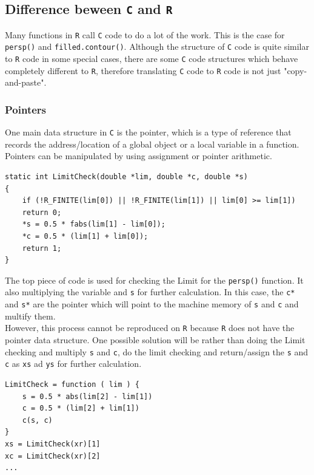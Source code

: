 \documentclass[paper=a4, fontsize=11pt]{report}
\begin{document}
\subsection{Difference beween \texttt{C} and \texttt{R}}
Many functions in \texttt{R} call \texttt{C} code to do a lot of the work.  This is the case for \texttt{persp()} and \texttt{filled.contour()}. Although the structure of \texttt{C} code is quite similar to \texttt{R} code in some special cases, there are some \texttt{C} code structures which behave completely different to \texttt{R}, therefore translating \texttt{C} code to \texttt{R} code is not just "copy-and-paste".\\

\subsubsection{Pointers}
One main data structure in \texttt{C} is the pointer, which is a type of reference that records the address/location of a global object or a local variable in a function. Pointers can be manipulated by using assignment or pointer arithmetic.
\begin{lstlisting}
static int LimitCheck(double *lim, double *c, double *s)
{
    if (!R_FINITE(lim[0]) || !R_FINITE(lim[1]) || lim[0] >= lim[1])
    return 0;
    *s = 0.5 * fabs(lim[1] - lim[0]);
    *c = 0.5 * (lim[1] + lim[0]);
    return 1;
}
\end{lstlisting}

The top piece of code is used for checking the Limit for the \texttt{persp()} function. It also multiplying the variable  and \texttt{s} for further calculation. In this case, the \texttt{c*} and \texttt{s*} are the pointer which will point to the machine memory of \texttt{s} and \texttt{c} and multify them.\\

However, this process cannot be reproduced on \texttt{R} because \texttt{R} does not have the pointer data structure. One possible solution will be rather than doing the Limit checking and multiply \texttt{s} and \texttt{c}, do the limit checking and return/assign the \texttt{s} and \texttt{c} as \texttt{xs} ad \texttt{ys} for further calculation.
\begin{lstlisting}
LimitCheck = function ( lim ) {
    s = 0.5 * abs(lim[2] - lim[1])
    c = 0.5 * (lim[2] + lim[1])
    c(s, c)
}
xs = LimitCheck(xr)[1]
xc = LimitCheck(xr)[2]
...
\end{lstlisting}
\end{document}
